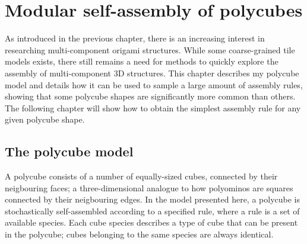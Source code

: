 \chapter{\label{ch:3-polycubes}Modular self-assembly of polycubes}
As introduced in the previous chapter, there is an increasing interest in researching multi-component origami structures. While some coarse-grained tile models exists, there still remains a need for methods to quickly explore the assembly of multi-component 3D structures.
This chapter describes my polycube model and details how it can be used to sample a large amount of assembly rules, showing that some polycube shapes are significantly more common than others. The following chapter will show how to obtain the simplest assembly rule for any given polycube shape.

\minitoc

\section{The polycube model}
A polycube consists of a number of equally-sized cubes, connected by their neigbouring faces; a three-dimensional analogue to how polyominos are squares connected by their neigbouring edges. In the model presented here, a polycube is stochastically self-assembled according to a specified rule, where a rule is a set of available species. Each cube species describes a type of cube that can be present in the polycube; cubes belonging to the same species are always identical.

